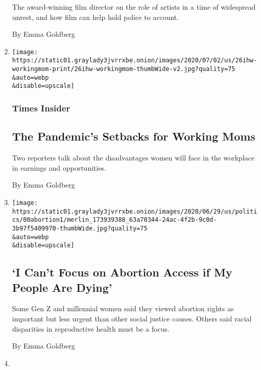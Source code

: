 \begin{enumerate}
  The award-winning film director on the role of artists in a time of
  widespread unrest, and how film can help hold police to account.

  By Emma Goldberg
\item
  \href{/2020/07/02/insider/virus-working-moms.html}{}

  \texttt{[image: https://static01.graylady3jvrrxbe.onion/images/2020/07/02/us/26ihw-workingmom-print/26ihw-workingmom-thumbWide-v2.jpg?quality=75\\\&auto=webp\\\&disable=upscale]}

  \hypertarget{times-insider}{%
  \subsubsection{Times Insider}\label{times-insider}}

  \hypertarget{the-pandemics-setbacks-for-working-moms}{%
  \subsection{The Pandemic's Setbacks for Working
  Moms}\label{the-pandemics-setbacks-for-working-moms}}

  Two reporters talk about the disadvantages women will face in the
  workplace in earnings and opportunities.

  By Emma Goldberg
\item
  \href{/2020/06/30/us/politics/abortion-supreme-court-gen-z.html}{}

  \texttt{[image: https://static01.graylady3jvrrxbe.onion/images/2020/06/29/us/politics/00abortion1/merlin\_173939388\_63a70344-24ac-4f2b-9c0d-3b97f5409970-thumbWide.jpg?quality=75\\\&auto=webp\\\&disable=upscale]}

  \hypertarget{i-cant-focus-on-abortion-access-if-my-people-are-dying}{%
  \subsection{`I Can't Focus on Abortion Access if My People Are
  Dying'}\label{i-cant-focus-on-abortion-access-if-my-people-are-dying}}

  Some Gen Z and millennial women said they viewed abortion rights as
  important but less urgent than other social justice causes. Others
  said racial disparities in reproductive health must be a focus.

  By Emma Goldberg
\item
  \href{/2020/06/23/us/essential-workers-high-school-senior-covid19.html}{}


\end{enumerate}
